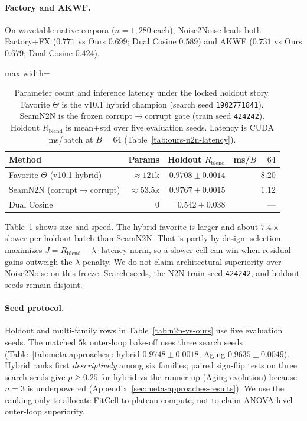 \paragraph{Factory and AKWF.}
On wavetable-native corpora ($n{=}1{,}280$ each), Noise2Noise leads both Factory+FX
($0.771$ vs Ours $0.699$; Dual Cosine $0.589$)
and AKWF
($0.731$ vs Ours $0.679$; Dual Cosine $0.424$).

\begin{table}[htbp]
  \centering
  \caption{Parameter count and inference latency under the locked holdout story.
    Favorite $\Theta$ is the v10.1 hybrid champion (search seed \texttt{1902771841}).
    SeamN2N is the frozen corrupt$\to$corrupt gate (train seed \texttt{424242}).
    Holdout $R_{\mathrm{blend}}$ is mean$\pm$std over five evaluation seeds.
    Latency is CUDA ms/batch at $B{=}64$ (Table~\ref{tab:ours-n2n-latency}).}
  \label{tab:param-fairness}
  \setlength{\tabcolsep}{4pt}
  \begin{adjustbox}{max width=\columnwidth}
\begin{tabular}{@{}lrrr@{}}
    \toprule
    Method & Params & Holdout $R_{\mathrm{blend}}$ & ms/$B{=}64$ \\
    \midrule
    Favorite $\Theta$ (v10.1 hybrid) & ${\approx}121$k & $0.9708{\pm}0.0014$ & $8.20$ \\
    SeamN2N (corrupt$\to$corrupt) & ${\approx}53.5$k & $0.9767{\pm}0.0015$ & $1.12$ \\
    Dual Cosine & $0$ & $0.542{\pm}0.038$ & --- \\
    \bottomrule
  \end{tabular}
\end{adjustbox}
\end{table}

Table~\ref{tab:param-fairness} shows size and speed.
The hybrid favorite is larger and about $7.4\times$ slower per holdout batch than SeamN2N.
That is partly by design: selection maximizes $J=R_{\mathrm{blend}}-\lambda\cdot\mathrm{latency\_norm}$,
so a slower cell can win when residual gains outweigh the $\lambda$ penalty.
We do not claim architectural superiority over Noise2Noise on this freeze.
Search seeds, the N2N train seed \texttt{424242}, and holdout seeds remain disjoint.

\paragraph{Seed protocol.}
Holdout and multi-family rows in Table~\ref{tab:n2n-vs-ours} use five evaluation seeds.
The matched $5$k outer-loop bake-off uses three search seeds
(Table~\ref{tab:meta-approaches}: hybrid $0.9748{\pm}0.0018$, Aging $0.9635{\pm}0.0049$).
Hybrid ranks first \emph{descriptively} among six families; paired sign-flip tests on three search seeds give $p{\ge}0.25$ for hybrid vs the runner-up (Aging evolution) because $n{=}3$ is underpowered (Appendix~\ref{sec:meta-approaches-results}).
We use the ranking only to allocate FitCell-to-plateau compute, not to claim ANOVA-level outer-loop superiority.

